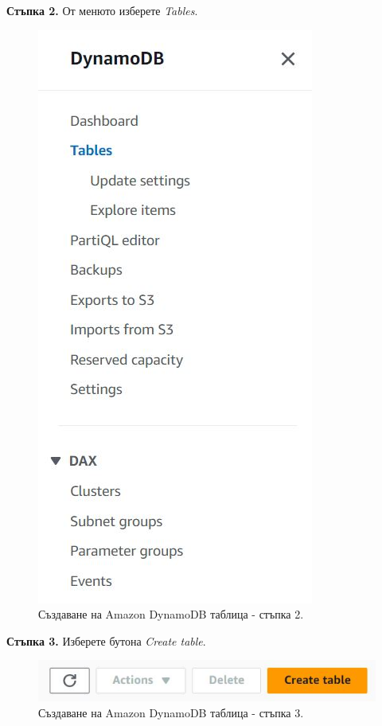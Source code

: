 \documentclass[12pt]{article}
\begin{document}
\noindent\textbf{Стъпка 2.} От менюто изберете \textit{Tables}.
\begin{figure}[h!]
\centering
    \includegraphics[scale=0.55]{instructions/dynamodb/2.JPG}
  \caption{Създаване на Amazon DynamoDB таблица - стъпка 2.}
\end{figure}

\noindent\textbf{Стъпка 3.} Изберете бутона \textit{Create table}.
\begin{figure}[h!]
\centering
    \includegraphics[scale=0.6]{instructions/dynamodb/3.JPG}
  \caption{Създаване на Amazon DynamoDB таблица - стъпка 3.}
\end{figure}
\end{document}

